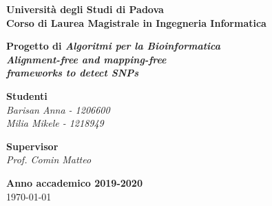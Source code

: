 \documentclass[11pt]{article}
\theoremstyle{definition}
\begin{document}
\begin{titlepage}
   \begin{center}
       	\vspace*{1cm}

	   	\textbf{\Large Università degli Studi di Padova\\}
	   	\vspace{0.2cm}
		\textbf{\Large Corso di Laurea Magistrale in Ingegneria Informatica}

		\vspace{5cm}
		\textbf{\huge Progetto di \textit{Algoritmi per la Bioinformatica}\\}
		\vspace{0.5cm}
      	\textbf{\huge \textit{Alignment-free and mapping-free \\}}
      	\vspace{0.2cm}
		\textbf{\huge \textit{frameworks to detect SNPs}}     
		 	
       	\vspace{6.3cm}

		\begin{Large}
			\begin{flushright}
				\textbf{Studenti\\}
				\textit{Barisan Anna - 1206600\\ Milia Mikele - 1218949}
			\end{flushright}
		\end{Large}
		
       \begin{Large}
			\begin{flushleft}
				\textbf{Supervisor\\}
				\textit{Prof. Comin Matteo}
			\end{flushleft}
		\end{Large}

       \vfill
       \vspace{0.5cm}
            
       \textbf{Anno accademico 2019-2020}\\
       \today
       

\end{center}
\end{titlepage}
\end{document}
